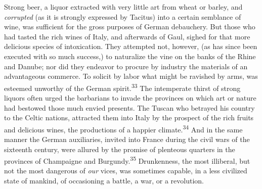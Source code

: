 


Strong beer, a liquor extracted with very little art from wheat
or barley, and \textit{corrupted} (as it is strongly expressed by
Tacitus) into a certain semblance of wine, was sufficient for the
gross purposes of German debauchery. But those who had tasted the
rich wines of Italy, and afterwards of Gaul, sighed for that more
delicious species of intoxication. They attempted not, however,
(as has since been executed with so much success,) to naturalize
the vine on the banks of the Rhine and Danube; nor did they
endeavor to procure by industry the materials of an advantageous
commerce. To solicit by labor what might be ravished by arms, was
esteemed unworthy of the German spirit.\textsuperscript{33} The intemperate thirst
of strong liquors often urged the barbarians to invade the
provinces on which art or nature had bestowed those much envied
presents. The Tuscan who betrayed his country to the Celtic
nations, attracted them into Italy by the prospect of the rich
fruits and delicious wines, the productions of a happier climate.\textsuperscript{34}
And in the same manner the German auxiliaries, invited into
France during the civil wars of the sixteenth century, were
allured by the promise of plenteous quarters in the provinces of
Champaigne and Burgundy.\textsuperscript{35} Drunkenness, the most illiberal, but
not the most dangerous of \textit{our} vices, was sometimes capable, in
a less civilized state of mankind, of occasioning a battle, a
war, or a revolution.




